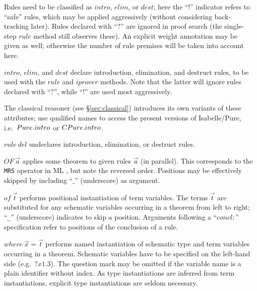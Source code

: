 \begin{descr}
  Rules need to be classified as $intro$, $elim$, or $dest$; here the ``$!$''
  indicator refers to ``safe'' rules, which may be applied aggressively
  (without considering back-tracking later).  Rules declared with ``$?$'' are
  ignored in proof search (the single-step $rule$ method still observes
  these).  An explicit weight annotation may be given as well; otherwise the
  number of rule premises will be taken into account here.
  
\item [$intro$, $elim$, and $dest$] declare introduction, elimination, and
  destruct rules, to be used with the $rule$ and $iprover$ methods.  Note that
  the latter will ignore rules declared with ``$?$'', while ``$!$'' are used
  most aggressively.
  
  The classical reasoner (see \S\ref{sec:classical}) introduces its own
  variants of these attributes; use qualified names to access the present
  versions of Isabelle/Pure, i.e.\ $Pure{\mathord.}intro$ or $CPure{\mathord.}intro$.
  
\item [$rule~del$] undeclares introduction, elimination, or destruct rules.
  
\item [$OF~\vec a$] applies some theorem to given rules $\vec a$ (in
  parallel).  This corresponds to the \texttt{MRS} operator in ML
  \cite[\S5]{isabelle-ref}, but note the reversed order.  Positions may be
  effectively skipped by including ``$\_$'' (underscore) as argument.
  
\item [$of~\vec t$] performs positional instantiation of term variables.  The
  terms $\vec t$ are substituted for any schematic variables occurring in a
  theorem from left to right; ``\texttt{_}'' (underscore) indicates to skip a
  position.  Arguments following a ``$concl\colon$'' specification refer to
  positions of the conclusion of a rule.
  
\item [$where~\vec x = \vec t$] performs named instantiation of schematic type
  and term variables occurring in a theorem.  Schematic variables have to be
  specified on the left-hand side (e.g.\ $?x1\!.\!3$).  The question mark may
  be omitted if the variable name is a plain identifier without index.  As
  type instantiations are inferred from term instantiations, explicit type
  instantiations are seldom necessary.

\end{descr}


